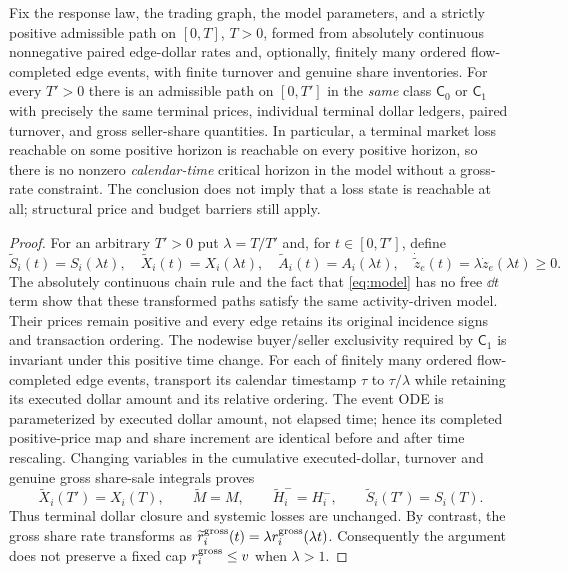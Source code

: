 \documentclass[review,hidelinks,onefignum,onetabnum]{siamonline250211}%
\begin{document}
\begin{proposition}
\label{prop:time-change}
Fix the response law, the trading graph, the model parameters,
and a strictly positive admissible path on $[0,T]$, $T>0$,
formed from absolutely continuous nonnegative paired edge-dollar
rates and, optionally, finitely many ordered flow-completed edge
events, with finite turnover and genuine share inventories.
For every $T'>0$
there is an admissible path on $[0,T']$ in the \emph{same} class
$\mathsf C_0$ or $\mathsf C_1$ with precisely the same terminal
prices, individual terminal dollar ledgers, paired turnover, and
gross seller-share quantities. In particular, a terminal market
loss reachable on some positive horizon is reachable on every
positive horizon, so there is no nonzero \emph{calendar-time}
critical horizon in the model without a gross-rate constraint.
The conclusion does not imply that a loss state is reachable at
all; structural price and budget barriers still apply.
\end{proposition}
\begin{proof}
For an arbitrary $T'>0$ put $\lambda=T/T'$ and, for
$t\in[0,T']$, define
\[
 \widetilde S_i(t)=S_i(\lambda t),\quad
 \widetilde X_i(t)=X_i(\lambda t),\quad
 \widetilde A_i(t)=A_i(\lambda t),\quad
 \dot{\widetilde z}_e(t)
       =\lambda\dot z_e(\lambda t)\ge0.
\]
The absolutely continuous chain rule and the fact that
\eqref{eq:model} has no free $\dd t$ term show that these
transformed paths satisfy the same activity-driven model.
Their prices remain positive and every edge retains its
original incidence signs and transaction ordering.
The nodewise buyer/seller exclusivity required by
$\mathsf C_1$ is invariant under this positive time change.
For each of finitely many ordered flow-completed edge events,
transport its calendar timestamp $\tau$ to $\tau/\lambda$
while retaining its executed dollar amount and its relative
ordering. The event ODE is parameterized by executed dollar amount,
not elapsed time; hence its completed positive-price map and
share increment are identical before and after time rescaling.
Changing variables in the cumulative executed-dollar,
turnover and genuine gross share-sale integrals proves
\[
 \widetilde X_i(T')=X_i(T),\qquad
 \widetilde M=M,\qquad
 \widetilde H_i^-=H_i^-,\qquad
 \widetilde S_i(T')=S_i(T).
\]
Thus terminal dollar closure and systemic losses are unchanged.
By contrast, the gross share rate transforms as
$\widetilde r_i^{\rm gross}(t)
 =\lambda r_i^{\rm gross}(\lambda t)$.
Consequently the argument does not preserve a fixed cap
$r_i^{\rm gross}\le v$ when $\lambda>1$.
\end{proof}
\end{document}
